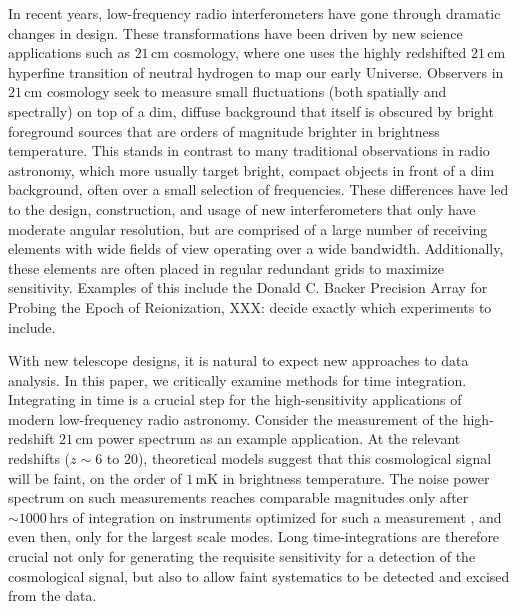 \documentclass[twocolumn,apj,numberedappendix]{emulateapj}
\begin{document}
In recent years, low-frequency radio interferometers have gone through dramatic changes in design.
These transformations have been driven by new science applications such as $21\,\textrm{cm}$
cosmology, where one uses the highly redshifted $21\,\textrm{cm}$ hyperfine transition
of neutral hydrogen to map our early Universe. Observers in $21\,\textrm{cm}$ cosmology seek to
measure small fluctuations (both spatially and spectrally) on top of a dim, diffuse background that itself is obscured by bright
foreground sources that are orders of magnitude brighter in brightness temperature. This stands
in contrast to many traditional observations in radio astronomy, which more usually target bright,
compact objects in front of a dim background, often over a small selection of frequencies. These differences have led to the design, construction, 
and usage of new interferometers that only have moderate angular resolution, but are comprised of a
large number of receiving elements with wide fields of view operating over a wide bandwidth. Additionally, these elements are often placed in regular redundant grids to maximize sensitivity. Examples of this include the Donald C. Backer Precision
Array for Probing the Epoch of Reionization, XXX: decide exactly which experiments to include.

With new telescope designs, it is natural to expect new approaches to data analysis. In this paper,
we critically examine methods for time integration. Integrating in time is a crucial step for the
high-sensitivity applications of modern low-frequency radio astronomy. Consider the measurement of
the high-redshift $21\,\textrm{cm}$ power spectrum as an example application. At the relevant redshifts ($z\sim 6$ to $20$), theoretical models suggest that this cosmological signal will be faint, on the order of $1\,\textrm{mK}$ in brightness temperature. The noise power spectrum on such
measurements reaches comparable magnitudes only after $\sim 1000\,\textrm{hrs}$ of integration
on instruments optimized for such a measurement \citep{parsons_et_al2012a}, and even then, only for the largest scale modes.
Long time-integrations are therefore crucial not only for generating the requisite sensitivity for a
detection of the cosmological signal, but also to allow faint systematics to be detected and excised
from the data.
\end{document}
